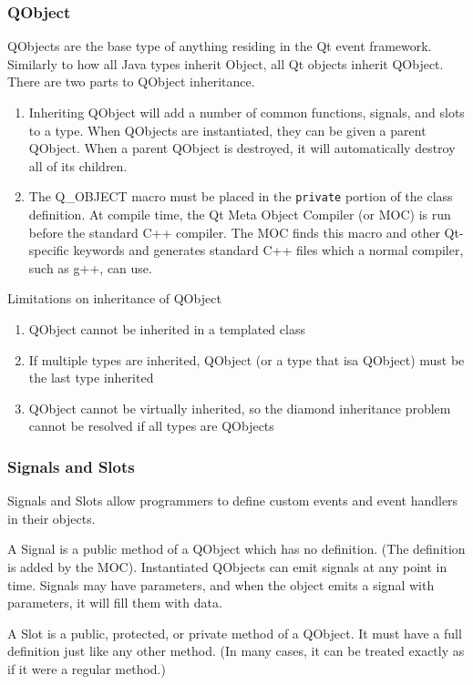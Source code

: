 \subsubsection*{QObject}
	QObjects are the base type of anything residing in the Qt event framework. Similarly to how all Java types inherit Object, all Qt objects inherit QObject. There are two parts to QObject inheritance.
	\begin{enumerate}
		\item Inheriting QObject will add a number of common functions, signals, and slots to a type. When QObjects are instantiated, they can be given a parent QObject. When a parent QObject is destroyed, it will automatically destroy all of its children.
		\item The Q\_OBJECT macro must be placed in the \lstinline|private| portion of the class definition. At compile time, the Qt Meta Object Compiler (or MOC) is run before the standard C++ compiler. The MOC finds this macro and other Qt-specific keywords and generates standard C++ files which a normal compiler, such as g++, can use.
	\end{enumerate}
	
	Limitations on inheritance of QObject
\begin{enumerate}
	\item QObject cannot be inherited in a templated class
	\item If multiple types are inherited, QObject (or a type that isa QObject) must be the last type inherited
	\item QObject cannot be virtually inherited, so the diamond inheritance problem cannot be resolved if all types are QObjects
\end{enumerate}
	
\subsubsection*{Signals and Slots}
Signals and Slots allow programmers to define custom events and event handlers in their objects. 

A Signal is a public method of a QObject which has no definition. (The definition is added by the MOC). Instantiated QObjects can emit signals at any point in time. Signals may have parameters, and when the object emits a signal with parameters, it will fill them with data.

A Slot is a public, protected, or private method of a QObject. It must have a full definition just like any other method. (In many cases, it can be treated exactly as if it were a regular method.)

